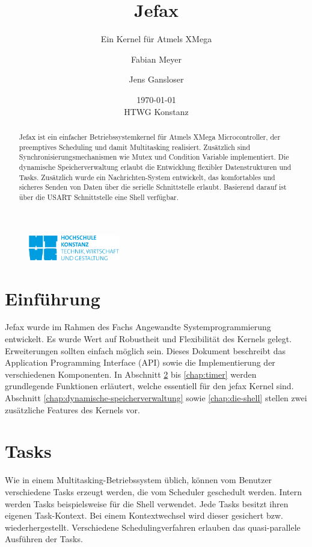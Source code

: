 \documentclass[fontsize=12pt, toc=bibliography, notitlepage]{scrreprt}
\begin{document}
\title{Jefax}
\subtitle{Ein Kernel für Atmels XMega}
\author{Fabian Meyer \and Jens Gansloser}
\date{\today \\ HTWG Konstanz}
\maketitle
\thispagestyle{empty}

\begin{figure}[H]
	\centering
	\includegraphics[width=150px]{images/htwgLogo.jpg}
\end{figure}

\begin{abstract}
Jefax ist ein einfacher Betriebssystemkernel für Atmels XMega Microcontroller, der preemptives Scheduling und damit Multitasking realisiert. Zusätzlich sind Synchronisierungsmechanismen wie Mutex und Condition Variable implementiert. Die dynamische Speicherverwaltung erlaubt die Entwicklung flexibler Datenstrukturen und Tasks. Zusätzlich wurde ein Nachrichten-System entwickelt, das komfortables und sicheres Senden von Daten über die serielle Schnittstelle erlaubt. Basierend darauf ist über die USART Schnittstelle eine Shell verfügbar.
\end{abstract}
\clearpage

\tableofcontents

\chapter{Einführung}
\label{chap:intro}
Jefax wurde im Rahmen des Fachs Angewandte Systemprogrammierung entwickelt. Es wurde Wert auf Robustheit und Flexibilität des Kernels gelegt. Erweiterungen sollten einfach möglich sein. Dieses Dokument beschreibt das Application Programming Interface (API) sowie die Implementierung der verschiedenen Komponenten. In Abschnitt \ref{chap:tasks} bis \ref{chap:timer} werden grundlegende Funktionen erläutert, welche essentiell für den jefax Kernel sind. Abschnitt \ref{chap:dynamische-speicherverwaltung} sowie \ref{chap:die-shell} stellen zwei zusätzliche Features des Kernels vor.

\chapter{Tasks}
\label{chap:tasks}
Wie in einem Multitasking-Betriebssystem üblich, können vom Benutzer verschiedene Tasks erzeugt werden, die vom Scheduler geschedult werden. Intern werden Tasks beispielsweise für die Shell verwendet. Jede Tasks besitzt ihren eigenen Task-Kontext. Bei einem Kontextwechsel wird dieser gesichert bzw. wiederhergestellt. Verschiedene Schedulingverfahren erlauben das quasi-parallele Ausführen der Tasks.
\end{document}
